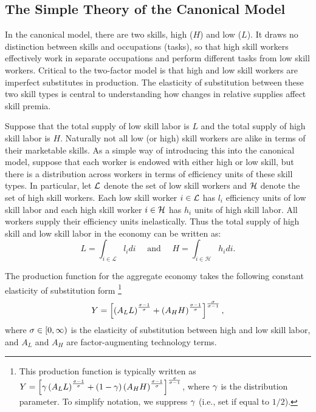 \documentclass[12pt]{article}
\theoremstyle{definition}
\begin{document}
\subsection{The Simple Theory of the Canonical Model}

In the canonical model, there are two skills, high ($H$) and low ($L$). It draws no distinction between skills and occupations (tasks), so that high skill workers effectively work in separate occupations and perform different tasks from low skill workers. Critical to the two-factor model is that high and low skill workers are imperfect substitutes in production. The elasticity of substitution between these two skill types is central to understanding how changes in relative supplies affect skill premia. 

Suppose that the total supply of low skill labor is $L$ and the total supply of high skill labor is $H$. Naturally not all low (or high) skill workers are alike in terms of their marketable skills. As a simple way of introducing this into the canonical model, suppose that each worker is endowed with either high or low skill, but there is a distribution across workers in terms of efficiency units of these skill types. In particular, let $\mathcal{L}$ denote the set of low skill workers and $\mathcal{H}$ denote the set of high skill workers. Each low skill worker $i \in \mathcal{L}$ has $l_i$ efficiency units of low skill labor and each high skill worker $i \in \mathcal{H}$ has $h_i$ units of high skill labor. All workers supply their efficiency units inelastically. Thus the total supply of high skill and low skill labor in the economy can be written as:
$$
L=\int_{i \in \mathcal{L}} l_i d i \quad \text { and } \quad H=\int_{i \in \mathcal{H}} h_i d i .
$$

The production function for the aggregate economy takes the following constant elasticity of substitution form \footnote{This production function is typically written as $Y = \left[ \gamma\left( A_L L \right)^{\frac{\sigma - 1}{\sigma}} + \left( 1-\gamma \right)\left( A_H H \right)^{\frac{\sigma - 1}{\sigma}} \right]^{\frac{\sigma}{\sigma - 1}}$, where $\gamma$ is the distribution parameter. To simplify notation, we suppress $\gamma$ (i.e., set if equal to $1/2$).}
\begin{equation}
    \label{canonical_model_production_function}
    Y = \left[ \left( A_L L \right)^{\frac{\sigma - 1}{\sigma}} + \left( A_H H \right)^{\frac{\sigma - 1}{\sigma}} \right]^{\frac{\sigma}{\sigma - 1}},
\end{equation}
where $\sigma \in [0, \infty)$ is the elasticity of substitution between high and low skill labor, and $A_L$ and $A_H$ are factor-augmenting technology terms. 
\end{document}
